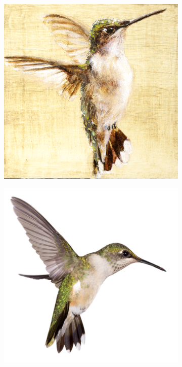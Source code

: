 \begin{figure}[t]
  \captionsetup[subfigure]{labelformat=empty}
  \begin{subfigure}[b]{0.244\textwidth}
    \includegraphics[width=\textwidth]{gfx/app-content-aware-1}
  \end{subfigure}
  \begin{subfigure}[b]{0.244\textwidth}
    \includegraphics[width=\textwidth]{gfx/app-content-aware-2}

\end{subfigure}
\end{figure}
